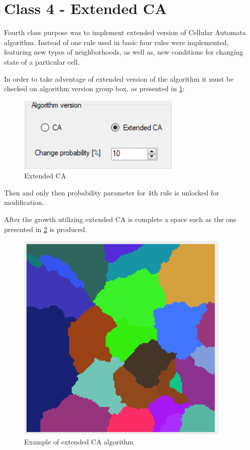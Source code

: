 \documentclass[a4paper, 11pt]{article}
\begin{document}
\section*{Class 4 - Extended CA}
Fourth class purpose was to implement extended version of Cellular Automata algorithm. Instead of one rule used in basic four rules were implemented, featuring new types of neighborhoods, as well as, new conditions for changing state of a particular cell.

In order to take adventage of extended version of the algorithm it must be checked on algorithm version group box, as presented in \ref{ExtendedCAGroupBoxLabel}:
\begin{figure}[H]
\centering
  \includegraphics{ExtendedCAGroupBox}
  \caption{Extended CA}
  \label{ExtendedCAGroupBoxLabel}
\end{figure}
Then and only then probability parameter for 4th rule is unlocked for modification.

After the growth utilizing extended CA is complete a space such as the one presented in \ref{ExtendedCAExampleLabel} is produced.
\begin{figure}[H]
\centering
  \includegraphics[]{ExtendedCAExample}
  \caption{Example of extended CA algorithm}
  \label{ExtendedCAExampleLabel}
\end{figure}
\end{document}

